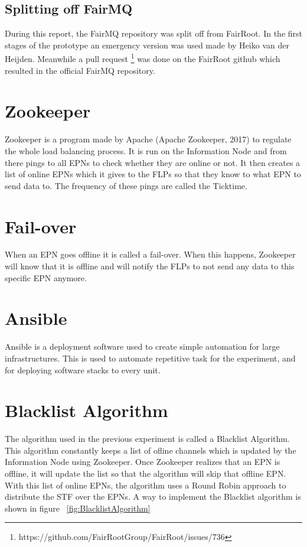 \subsection{Splitting off FairMQ}
During this report, the FairMQ repository was split off from FairRoot. In the first stages of the prototype an emergency version was used made by Heiko van der Heijden. Meanwhile a pull request 
\footnote{https://github.com/FairRootGroup/FairRoot/issues/736} was done on the FairRoot github which resulted in the official FairMQ repository.

\section{Zookeeper}
Zookeeper is a program made by Apache (Apache Zookeeper, 2017) to regulate the whole load balancing process. It is run on the Information Node and from there pings to all EPNs to check whether they are online or not. It then creates a list of online EPNs which it gives to the FLPs so that they know to what EPN to send data to. The frequency of these pings are called the Ticktime. 

\section{Fail-over}
When an EPN goes offline it is called a fail-over. When this happens, Zookeeper will know that it is offline and will notify the FLPs to not send any data to this specific EPN anymore. 

\section{Ansible}
Ansible is a deployment software used to create simple automation for large infrastructures. This is used to automate repetitive task for the experiment, and for deploying software stacks to every unit. 

\section{Blacklist Algorithm}
The algorithm used in the previous experiment is called a Blacklist Algorithm. This algorithm constantly keeps a list of ofline channels which is updated by the Information Node using Zookeeper. Once Zookeeper realizes that an EPN is offline, it will update the list so that the algorithm will skip that offline EPN. With this list of online EPNs, the algorithm uses a Round Robin approach to distribute the STF over the EPNs. A way to implement the Blacklist algorithm is shown in figure ~\ref{fig:BlacklistAlgorithm}

